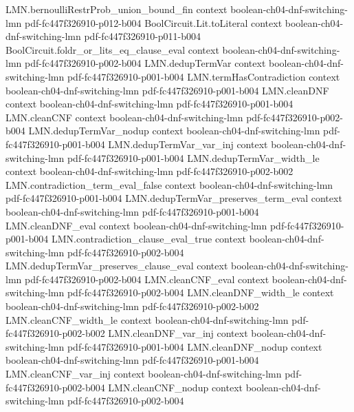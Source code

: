\begin{theorem}
\proofstep
  {LMN.bernoulliRestrProb_union_bound_fin}
  {context}
  {boolean-ch04-dnf-switching-lmn}
  {pdf-fc447f326910-p012-b004}
\proofstep
  {BoolCircuit.Lit.toLiteral}
  {context}
  {boolean-ch04-dnf-switching-lmn}
  {pdf-fc447f326910-p011-b004}
\proofstep
  {BoolCircuit.foldr_or_lits_eq_clause_eval}
  {context}
  {boolean-ch04-dnf-switching-lmn}
  {pdf-fc447f326910-p002-b004}
\proofstep
  {LMN.dedupTermVar}
  {context}
  {boolean-ch04-dnf-switching-lmn}
  {pdf-fc447f326910-p001-b004}
\proofstep
  {LMN.termHasContradiction}
  {context}
  {boolean-ch04-dnf-switching-lmn}
  {pdf-fc447f326910-p001-b004}
\proofstep
  {LMN.cleanDNF}
  {context}
  {boolean-ch04-dnf-switching-lmn}
  {pdf-fc447f326910-p001-b004}
\proofstep
  {LMN.cleanCNF}
  {context}
  {boolean-ch04-dnf-switching-lmn}
  {pdf-fc447f326910-p002-b004}
\proofstep
  {LMN.dedupTermVar_nodup}
  {context}
  {boolean-ch04-dnf-switching-lmn}
  {pdf-fc447f326910-p001-b004}
\proofstep
  {LMN.dedupTermVar_var_inj}
  {context}
  {boolean-ch04-dnf-switching-lmn}
  {pdf-fc447f326910-p001-b004}
\proofstep
  {LMN.dedupTermVar_width_le}
  {context}
  {boolean-ch04-dnf-switching-lmn}
  {pdf-fc447f326910-p002-b002}
\proofstep
  {LMN.contradiction_term_eval_false}
  {context}
  {boolean-ch04-dnf-switching-lmn}
  {pdf-fc447f326910-p001-b004}
\proofstep
  {LMN.dedupTermVar_preserves_term_eval}
  {context}
  {boolean-ch04-dnf-switching-lmn}
  {pdf-fc447f326910-p001-b004}
\proofstep
  {LMN.cleanDNF_eval}
  {context}
  {boolean-ch04-dnf-switching-lmn}
  {pdf-fc447f326910-p001-b004}
\proofstep
  {LMN.contradiction_clause_eval_true}
  {context}
  {boolean-ch04-dnf-switching-lmn}
  {pdf-fc447f326910-p002-b004}
\proofstep
  {LMN.dedupTermVar_preserves_clause_eval}
  {context}
  {boolean-ch04-dnf-switching-lmn}
  {pdf-fc447f326910-p002-b004}
\proofstep
  {LMN.cleanCNF_eval}
  {context}
  {boolean-ch04-dnf-switching-lmn}
  {pdf-fc447f326910-p002-b004}
\proofstep
  {LMN.cleanDNF_width_le}
  {context}
  {boolean-ch04-dnf-switching-lmn}
  {pdf-fc447f326910-p002-b002}
\proofstep
  {LMN.cleanCNF_width_le}
  {context}
  {boolean-ch04-dnf-switching-lmn}
  {pdf-fc447f326910-p002-b002}
\proofstep
  {LMN.cleanDNF_var_inj}
  {context}
  {boolean-ch04-dnf-switching-lmn}
  {pdf-fc447f326910-p001-b004}
\proofstep
  {LMN.cleanDNF_nodup}
  {context}
  {boolean-ch04-dnf-switching-lmn}
  {pdf-fc447f326910-p001-b004}
\proofstep
  {LMN.cleanCNF_var_inj}
  {context}
  {boolean-ch04-dnf-switching-lmn}
  {pdf-fc447f326910-p002-b004}
\proofstep
  {LMN.cleanCNF_nodup}
  {context}
  {boolean-ch04-dnf-switching-lmn}
  {pdf-fc447f326910-p002-b004}
\proofstep

\end{theorem}
